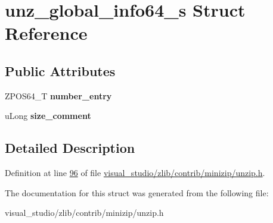 \hypertarget{structunz__global__info64__s}{}\section{unz\+\_\+global\+\_\+info64\+\_\+s Struct Reference}
\label{structunz__global__info64__s}
\subsection*{Public Attributes}
\begin{DoxyCompactItemize}
\item 
\mbox{\label{structunz__global__info64__s_a628f94ac445f2a6cd64c9e82d481e738}} 
Z\+P\+O\+S64\+\_\+T {\bfseries number\+\_\+entry}
\item 
\mbox{\label{structunz__global__info64__s_ad9440fb3b019cfdac9ba8b8d83026ffc}} 
u\+Long {\bfseries size\+\_\+comment}
\end{DoxyCompactItemize}


\subsection{Detailed Description}


Definition at line \hyperlink{visual__studio_2zlib_2contrib_2minizip_2unzip_8h_source_l00096}{96} of file \hyperlink{visual__studio_2zlib_2contrib_2minizip_2unzip_8h_source}{visual\+\_\+studio/zlib/contrib/minizip/unzip.\+h}.



The documentation for this struct was generated from the following file\+:\begin{DoxyCompactItemize}
\item 
visual\+\_\+studio/zlib/contrib/minizip/unzip.\+h\end{DoxyCompactItemize}
